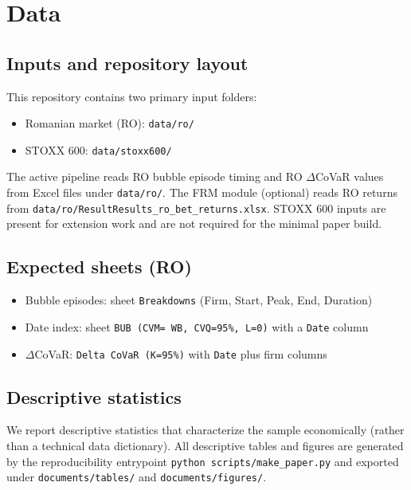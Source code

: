 \section{Data}

\subsection{Inputs and repository layout}

This repository contains two primary input folders:
\begin{itemize}
  \item Romanian market (RO): \texttt{data/ro/}
  \item STOXX 600: \texttt{data/stoxx600/}
\end{itemize}

The active pipeline reads RO bubble episode timing and RO $\Delta$CoVaR values from Excel files under \texttt{data/ro/}.
The FRM module (optional) reads RO returns from \texttt{data/ro/ResultResults\_ro\_bet\_returns.xlsx}.
STOXX 600 inputs are present for extension work and are not required for the minimal paper build.

\subsection{Expected sheets (RO)}
\begin{itemize}
  \item Bubble episodes: sheet \texttt{Breakdowns} (Firm, Start, Peak, End, Duration)
  \item Date index: sheet \texttt{BUB (CVM= WB, CVQ=95\%, L=0)} with a \texttt{Date} column
  \item $\Delta$CoVaR: \texttt{Delta CoVaR (K=95\%)} with \texttt{Date} plus firm columns
\end{itemize}

\subsection{Descriptive statistics}

We report descriptive statistics that characterize the sample economically (rather than a technical data dictionary).
All descriptive tables and figures are generated by the reproducibility entrypoint \texttt{python scripts/make\_paper.py} and exported under \texttt{documents/tables/} and \texttt{documents/figures/}.


